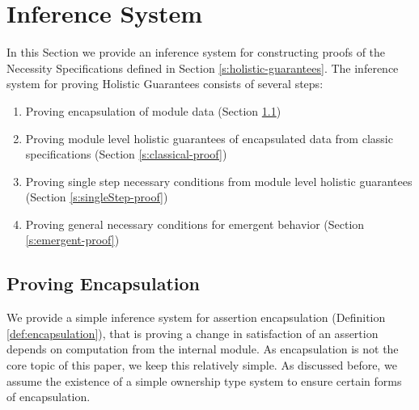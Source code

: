 \section{Inference System}  
\label{s:inference}

In this Section we provide an inference system for constructing 
proofs of the Necessity Specifications defined in Section \ref{s:holistic-guarantees}.
The inference system for proving Holistic Guarantees consists of several steps:
\begin{enumerate}
\item
Proving encapsulation of module data (Section \ref{s:encap-proof})
\item
Proving module level holistic guarantees of encapsulated data from classic specifications (Section \ref{s:classical-proof})
\item
Proving single step necessary conditions from module level holistic guarantees (Section \ref{s:singleStep-proof})
\item
Proving general necessary conditions for emergent behavior (Section \ref{s:emergent-proof})
\end{enumerate}

\subsection{Proving Encapsulation}
\label{s:encap-proof}

We provide a simple inference system for assertion encapsulation (Definition \ref{def:encapsulation}),
that is proving a change in satisfaction of an assertion depends on computation from the internal module. 
As encapsulation is not the core topic of this paper, we keep this relatively simple. As discussed before, 
we assume the existence of a simple ownership type system to ensure certain forms of encapsulation.

